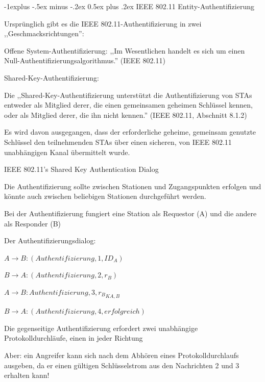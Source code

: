 \documentclass[a4paper]{article}
\makeatletter
\renewcommand{\subsection}{\@startsection{subsection}{2}{0mm}%
 {-1explus -.5ex minus -.2ex}%
 {0.5ex plus .2ex}%
 {\normalfont\normalsize\bfseries}}
\makeatother
\begin{document}
\begin{multicols}{3}
      \subsection{IEEE 802.11 Entity-Authentifizierung}
      \begin{itemize*}
            \item Ursprünglich gibt es die IEEE 802.11-Authentifizierung in zwei ,,Geschmacksrichtungen'':
            \begin{itemize*}
                  \item Offene System-Authentifizierung: ,,Im Wesentlichen handelt es sich um einen Null-Authentifizierungsalgorithmus.'' (IEEE 802.11)
                  \item Shared-Key-Authentifizierung:
                  \begin{itemize*}
                        \item Die ,,Shared-Key-Authentifizierung unterstützt die Authentifizierung von STAs entweder als Mitglied derer, die einen gemeinsamen geheimen Schlüssel kennen, oder als Mitglied derer, die ihn nicht kennen.'' (IEEE 802.11, Abschnitt 8.1.2)
                        \item Es wird davon ausgegangen, dass der erforderliche geheime, gemeinsam genutzte Schlüssel den teilnehmenden STAs über einen sicheren, von IEEE 802.11 unabhängigen Kanal übermittelt wurde.
                  \end{itemize*}
            \end{itemize*}
      \end{itemize*}

      IEEE 802.11's Shared Key Authentication Dialog
      \begin{itemize*}
            \item Die Authentifizierung sollte zwischen Stationen und Zugangspunkten erfolgen und könnte auch zwischen beliebigen Stationen durchgeführt werden.
            \item Bei der Authentifizierung fungiert eine Station als Requestor (A) und die andere als Responder (B)
            \item Der Authentifizierungsdialog:
            \begin{enumerate*}
                  \item $A \rightarrow B: (Authentifizierung, 1, ID_A)$
                  \item $B \rightarrow A: (Authentifizierung, 2, r_B)$
                  \item $A \rightarrow B: {Authentifizierung, 3, r_B}_{{K}{A,B}}$
                  \item $B \rightarrow A: (Authentifizierung, 4, erfolgreich)$
            \end{enumerate*}
            \item Die gegenseitige Authentifizierung erfordert zwei unabhängige Protokolldurchläufe, einen in jeder Richtung
            \item Aber: ein Angreifer kann sich nach dem Abhören eines Protokolldurchlaufs ausgeben, da er einen gültigen Schlüsselstrom aus den Nachrichten 2 und 3 erhalten kann!
      \end{itemize*}


\end{multicols}
\end{document}

